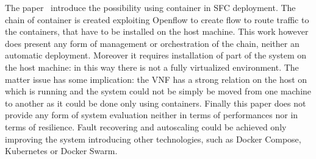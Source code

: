 The paper~\cite{kriti2017dnfc} introduce the possibility using container in SFC
deployment. The chain of container is created exploiting Openflow to create flow
to route traffic to the containers, that have to be installed on the host
machine. This work however does present any form of management or orchestration
of the chain, neither an automatic deployment. Moreover it requires installation
of part of the system on the host machine: in this way there is not a fully
virtualized environment. The matter issue has some implication: the VNF
has a strong relation on the host on which is running and the system could not
be simply be moved from one machine to another as it could be done only using
containers. Finally this paper does not provide any form of system evaluation
neither in terms of performances nor in terms of resilience. Fault recovering
and autoscaling could be achieved only improving the system introducing other
technologies, such as Docker Compose, Kubernetes or Docker Swarm. 






